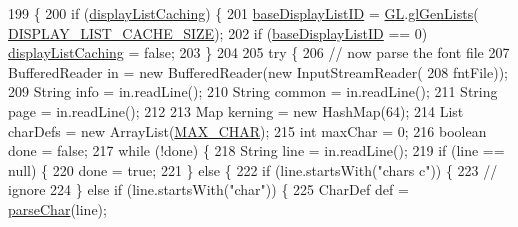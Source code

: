 \begin{DoxyCode}
199                                                                      \{
200         \textcolor{keywordflow}{if} (\mbox{\hyperlink{classorg_1_1newdawn_1_1slick_1_1_angel_code_font_a1b429bd8175e017d9df97818af84cb06}{displayListCaching}}) \{
201             \mbox{\hyperlink{classorg_1_1newdawn_1_1slick_1_1_angel_code_font_af768584a5e95470e18937a431dd4bcb1}{baseDisplayListID}} = \mbox{\hyperlink{classorg_1_1newdawn_1_1slick_1_1_angel_code_font_a22c7ebf9e7aad9665c6866438b675da2}{GL}}.\mbox{\hyperlink{interfaceorg_1_1newdawn_1_1slick_1_1opengl_1_1renderer_1_1_s_g_l_a2c623d00bb2450569a6c86a71024b83d}{glGenLists}}(
      \mbox{\hyperlink{classorg_1_1newdawn_1_1slick_1_1_angel_code_font_a493a4a9c0c402ad916d51ef38b66e036}{DISPLAY\_LIST\_CACHE\_SIZE}});
202             \textcolor{keywordflow}{if} (\mbox{\hyperlink{classorg_1_1newdawn_1_1slick_1_1_angel_code_font_af768584a5e95470e18937a431dd4bcb1}{baseDisplayListID}} == 0) \mbox{\hyperlink{classorg_1_1newdawn_1_1slick_1_1_angel_code_font_a1b429bd8175e017d9df97818af84cb06}{displayListCaching}} = \textcolor{keyword}{false};
203         \}
204 
205         \textcolor{keywordflow}{try} \{
206             \textcolor{comment}{// now parse the font file}
207             BufferedReader in = \textcolor{keyword}{new} BufferedReader(\textcolor{keyword}{new} InputStreamReader(
208                     fntFile));
209             String info = in.readLine();
210             String common = in.readLine();
211             String page = in.readLine();
212 
213             Map kerning = \textcolor{keyword}{new} HashMap(64);
214             List charDefs = \textcolor{keyword}{new} ArrayList(\mbox{\hyperlink{classorg_1_1newdawn_1_1slick_1_1_angel_code_font_ab0bebe07d0e5a16dbccf3e99c2229f1a}{MAX\_CHAR}});
215             \textcolor{keywordtype}{int} maxChar = 0;
216             \textcolor{keywordtype}{boolean} done = \textcolor{keyword}{false};
217             \textcolor{keywordflow}{while} (!done) \{
218                 String line = in.readLine();
219                 \textcolor{keywordflow}{if} (line == null) \{
220                     done = \textcolor{keyword}{true};
221                 \} \textcolor{keywordflow}{else} \{
222                     \textcolor{keywordflow}{if} (line.startsWith(\textcolor{stringliteral}{"chars c"})) \{
223                         \textcolor{comment}{// ignore}
224                     \} \textcolor{keywordflow}{else} \textcolor{keywordflow}{if} (line.startsWith(\textcolor{stringliteral}{"char"})) \{
225                         CharDef def = \mbox{\hyperlink{classorg_1_1newdawn_1_1slick_1_1_angel_code_font_a8e57dd6e277285b9fdce64880a05a474}{parseChar}}(line);

\end{DoxyCode}
